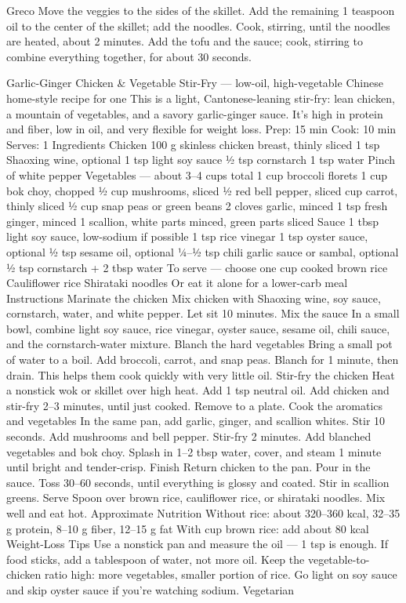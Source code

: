 Greco Move the veggies to the sides of the skillet. Add the remaining 1 teaspoon oil to the center of the skillet; add the noodles. Cook, stirring, until the noodles are heated, about 2 minutes. Add the tofu and the sauce; cook, stirring to combine everything together, for about 30 seconds.
\par

Garlic-Ginger Chicken \& Vegetable Stir-Fry  — low-oil, high-vegetable Chinese home-style recipe for one This is a light, Cantonese-leaning stir-fry: lean chicken, a mountain of vegetables, and a savory garlic-ginger sauce. It’s high in protein and fiber, low in oil, and very flexible for weight loss. Prep: 15 min Cook: 10 min Serves: 1 Ingredients Chicken 100 g skinless chicken breast, thinly sliced 1 tsp Shaoxing wine, optional 1 tsp light soy sauce ½ tsp cornstarch 1 tsp water Pinch of white pepper Vegetables — about 3–4 cups total 1 cup broccoli florets 1 cup bok choy, chopped ½ cup mushrooms, sliced ½ red bell pepper, sliced  cup carrot, thinly sliced ½ cup snap peas or green beans 2 cloves garlic, minced 1 tsp fresh ginger, minced 1 scallion, white parts minced, green parts sliced Sauce 1 tbsp light soy sauce, low-sodium if possible 1 tsp rice vinegar 1 tsp oyster sauce, optional ½ tsp sesame oil, optional ¼–½ tsp chili garlic sauce or sambal, optional ½ tsp cornstarch + 2 tbsp water To serve — choose one  cup cooked brown rice Cauliflower rice Shirataki noodles Or eat it alone for a lower-carb meal Instructions Marinate the chicken Mix chicken with Shaoxing wine, soy sauce, cornstarch, water, and white pepper. Let sit 10 minutes. Mix the sauce In a small bowl, combine light soy sauce, rice vinegar, oyster sauce, sesame oil, chili sauce, and the cornstarch-water mixture. Blanch the hard vegetables Bring a small pot of water to a boil. Add broccoli, carrot, and snap peas. Blanch for 1 minute, then drain. This helps them cook quickly with very little oil. Stir-fry the chicken Heat a nonstick wok or skillet over high heat. Add 1 tsp neutral oil. Add chicken and stir-fry 2–3 minutes, until just cooked. Remove to a plate. Cook the aromatics and vegetables In the same pan, add garlic, ginger, and scallion whites. Stir 10 seconds. Add mushrooms and bell pepper. Stir-fry 2 minutes. Add blanched vegetables and bok choy. Splash in 1–2 tbsp water, cover, and steam 1 minute until bright and tender-crisp. Finish Return chicken to the pan. Pour in the sauce. Toss 30–60 seconds, until everything is glossy and coated. Stir in scallion greens. Serve Spoon over brown rice, cauliflower rice, or shirataki noodles. Mix well and eat hot. Approximate Nutrition Without rice: about 320–360 kcal, 32–35 g protein, 8–10 g fiber, 12–15 g fat With  cup brown rice: add about 80 kcal Weight-Loss Tips Use a nonstick pan and measure the oil — 1 tsp is enough. If food sticks, add a tablespoon of water, not more oil. Keep the vegetable-to-chicken ratio high: more vegetables, smaller portion of rice. Go light on soy sauce and skip oyster sauce if you’re watching sodium. Vegetarian 